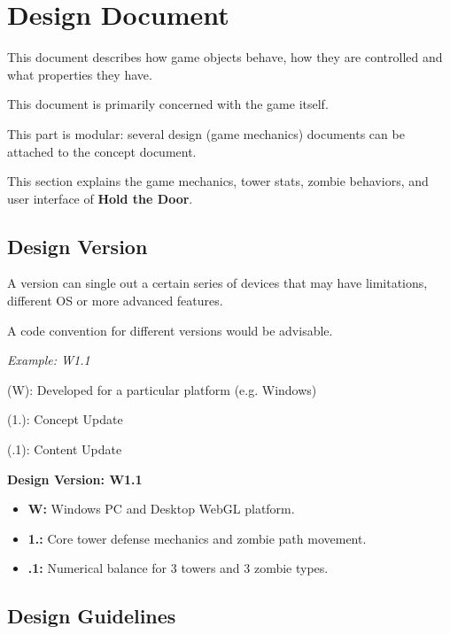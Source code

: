 \section{Design Document}

\begin{guidance}
This document describes how game objects behave, how they are controlled and what properties they have.

This document is primarily concerned with the game itself.

This part is modular: several design (game mechanics) documents can be attached to the concept document.
\end{guidance}
This section explains the game mechanics, tower stats, zombie behaviors, and user interface of \textbf{Hold the Door}.

\subsection{Design Version}

\begin{guidance}
A version can single out a certain series of devices that may have limitations, different OS or more advanced features.

A code convention for different versions would be advisable.

\textit{Example: W1.1}

(W): Developed for a particular platform (e.g. Windows)

(1.): Concept Update

(.1): Content Update
\end{guidance}
\textbf{Design Version: W1.1}
\begin{itemize}[label=\textbullet]
  \item \textbf{W:} Windows PC and Desktop WebGL platform.
  \item \textbf{1.:} Core tower defense mechanics and zombie path movement.
  \item \textbf{.1:} Numerical balance for 3 towers and 3 zombie types.
\end{itemize}

\subsection{Design Guidelines}

